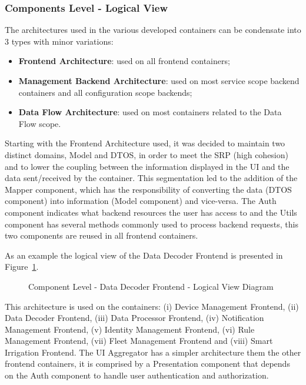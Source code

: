 \subsubsection{Components Level - Logical View}
\label{subsubsec:design:architecture:components:logical}

The architectures used in the various developed containers can be condensate into 3 types with minor variations:

\begin{itemize}
   \item \textbf{Frontend Architecture}: used on all frontend containers;
   \item \textbf{Management Backend Architecture}: used on most service scope backend containers and all configuration scope backends; 
   \item \textbf{Data Flow Architecture}: used on most containers related to the Data Flow scope.
\end{itemize}

Starting with the Frontend Architecture used, it was decided to maintain two distinct domains, Model and DTOS, in order to meet the \gls{SRP} (high cohesion) and to lower the coupling between the information displayed in the UI and the data sent/received by the container. This segmentation led to the addition of the Mapper component, which has the responsibility of converting the data (DTOS component) into information (Model component) and vice-versa. The Auth component indicates what backend resources the user has access to and the Utils component has several methods commonly used to process backend requests, this two components are reused in all frontend containers.

As an example the logical view of the Data Decoder Frontend is presented in Figure~\ref{fig:design:architecture:component:logical:diagram:decoder}.

\begin{figure}[H]
   \centering
   \resizebox{\columnwidth}{!}
   {
      
   }
   \caption[Component Level - Data Decoder Frontend - Logical View Diagram]{Component Level - Data Decoder Frontend - Logical View Diagram}
   \label{fig:design:architecture:component:logical:diagram:decoder}
\end{figure}

This architecture is used on the containers: (i) Device Management Frontend, (ii) Data Decoder Frontend, (iii) Data Processor Frontend, (iv) Notification Management Frontend, (v) Identity Management Frontend, (vi) Rule Management Frontend, (vii) Fleet Management Frontend and (viii) Smart Irrigation Frontend. The UI Aggregator has a simpler architecture them the other frontend containers, it is comprised by a Presentation component that depends on the Auth component to handle user authentication and authorization.

